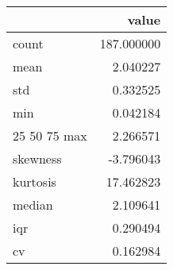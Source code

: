 \begin{tabular}{lr}
\toprule
 & value \\
\midrule
count & 187.000000 \\
mean & 2.040227 \\
std & 0.332525 \\
min & 0.042184 \\
25%
50%
75%
max & 2.266571 \\
skewness & -3.796043 \\
kurtosis & 17.462823 \\
median & 2.109641 \\
iqr & 0.290494 \\
cv & 0.162984 \\
\bottomrule
\end{tabular}
